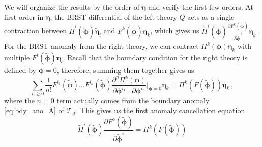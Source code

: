 \documentclass[11pt]{article}
\numberwithin{equation}{section}
\begin{document}
We will organize the results by the order of $\boldsymbol{\eta}$ and verify the first few orders. At first order in $\boldsymbol{\eta}$, the BRST differential of the left theory $\widetilde{Q}$ acts as a single contraction between $\widetilde{\Pi}^i(\widetilde{\boldsymbol{\phi}})\widetilde{\boldsymbol{\eta}}_i$ and $F^k(\widetilde{\boldsymbol{\phi}})\boldsymbol{\eta}_k$, which gives us $\widetilde{\Pi}^i(\widetilde{\boldsymbol{\phi}})\frac{\partial F^k(\widetilde{\boldsymbol{\phi}})}{\partial \widetilde{\boldsymbol{\phi}}^i}\boldsymbol{\eta}_k$. For the BRST anomaly from the right theory, we can contract $\Pi^k(\boldsymbol{\phi})\boldsymbol{\eta}_k$ with multiple $F^i(\widetilde{\boldsymbol{\phi}})\boldsymbol{\eta}_i$. Recall that the boundary condition for the right theory is defined by $\boldsymbol{\phi}=0$, therefore, summing them together gives us
\begin{equation}
	\sum_{n\geq 0}\frac{1}{n!}F^{i_1}(\widetilde{\boldsymbol{\phi}})\dots F^{i_n}(\widetilde{\boldsymbol{\phi}}) \frac{\partial^n \Pi^{k}(\boldsymbol{\phi})}{\partial \boldsymbol{\phi}^{i_1}\dots \partial \boldsymbol{\phi}^{i_n}}\Big|_{\boldsymbol{\phi}=0}\boldsymbol{\eta}_k = \Pi^k(F(\widetilde{\boldsymbol{\phi}}))\boldsymbol{\eta}_k\,,
 \end{equation} 
where the $n = 0$ term actually comes from the boundary anomaly \eqref{eq:bdy_ano_A} of $\mathcal{T}_A$. This gives us the first anomaly cancellation equation
\begin{equation}
	\widetilde{\Pi}^i(\widetilde{\boldsymbol{\phi}})\frac{\partial F^k(\widetilde{\boldsymbol{\phi}})}{\partial \widetilde{\boldsymbol{\phi}}^i} = \Pi^k(F(\widetilde{\boldsymbol{\phi}}))
\end{equation}
\end{document}
